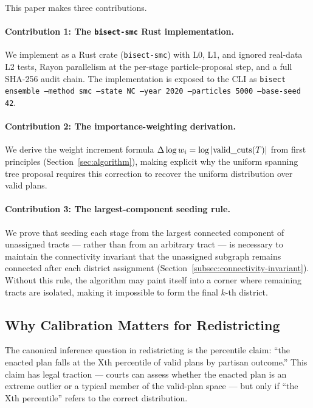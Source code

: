 This paper makes three contributions.

\paragraph{Contribution 1: The \texttt{bisect-smc} Rust implementation.}
We implement \smc{} as a Rust crate (\texttt{bisect-smc}) with L0, L1, and
ignored real-data L2 tests,
Rayon parallelism at the per-stage particle-proposal step, and a full SHA-256
audit chain.
The implementation is exposed to the CLI as
\texttt{bisect ensemble --method smc --state NC --year 2020 --particles 5000 --base-seed 42}.

\paragraph{Contribution 2: The importance-weighting derivation.}
We derive the weight increment formula $\Delta\log w_i = \log|{\rm
valid\_cuts}(T)|$ from first principles (Section~\ref{sec:algorithm}), making
explicit why the uniform spanning tree proposal requires this correction to
recover the uniform distribution over valid plans.

\paragraph{Contribution 3: The largest-component seeding rule.}
We prove that seeding each stage from the largest connected component of
unassigned tracts --- rather than from an arbitrary tract --- is necessary to
maintain the connectivity invariant that the unassigned subgraph remains
connected after each district assignment
(Section~\ref{subsec:connectivity-invariant}).
Without this rule, the algorithm may paint itself into a corner where
remaining tracts are isolated, making it impossible to form the final $k$-th
district.

\subsection{Why Calibration Matters for Redistricting}

The canonical inference question in redistricting is the percentile claim:
``the enacted plan falls at the Xth percentile of valid plans by partisan
outcome.''
This claim has legal traction --- courts can assess whether the enacted plan
is an extreme outlier or a typical member of the valid-plan space --- but only
if ``the Xth percentile'' refers to the correct distribution.

